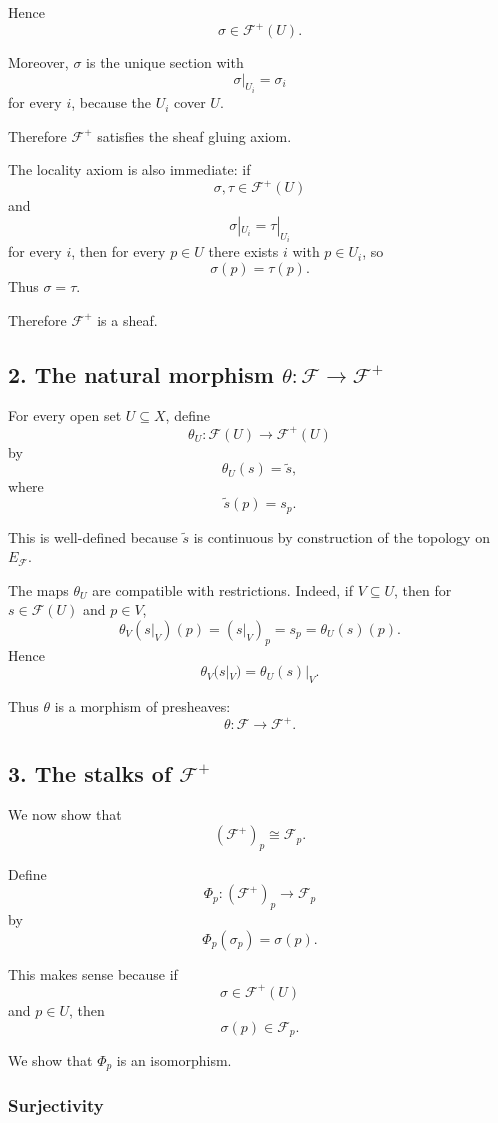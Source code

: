 Hence
\[
\sigma \in \mathcal F^+(U).
\]

Moreover, $\sigma$ is the unique section with
\[
\sigma|_{U_i} = \sigma_i
\]
for every $i$, because the $U_i$ cover $U$.

Therefore $\mathcal F^+$ satisfies the sheaf gluing axiom.

The locality axiom is also immediate: if
\[
\sigma,\tau \in \mathcal F^+(U)
\]
and
\[
\sigma|_{U_i} = \tau|_{U_i}
\]
for every $i$, then for every $p \in U$ there exists $i$ with $p \in U_i$,
so
\[
\sigma(p) = \tau(p).
\]
Thus $\sigma=\tau$.

Therefore $\mathcal F^+$ is a sheaf.

\subsection*{2. The natural morphism $\theta : \mathcal F \to \mathcal F^+$}

For every open set $U \subseteq X$, define
\[
\theta_U : \mathcal F(U) \longrightarrow \mathcal F^+(U)
\]
by
\[
\theta_U(s) = \widetilde{s},
\]
where
\[
\widetilde{s}(p) = s_p.
\]

This is well-defined because $\widetilde{s}$ is continuous by construction of
the topology on $E_{\mathcal F}$.

The maps $\theta_U$ are compatible with restrictions. Indeed, if
$V \subseteq U$, then for $s \in \mathcal F(U)$ and $p \in V$,
\[
\theta_V(s|_V)(p)
=
(s|_V)_p
=
s_p
=
\theta_U(s)(p).
\]
Hence
\[
\theta_V(s|_V)
=
\theta_U(s)|_V.
\]

Thus $\theta$ is a morphism of presheaves:
\[
\theta : \mathcal F \longrightarrow \mathcal F^+.
\]

\subsection*{3. The stalks of $\mathcal F^+$}

We now show that
\[
(\mathcal F^+)_p \cong \mathcal F_p.
\]

Define
\[
\Phi_p : (\mathcal F^+)_p \longrightarrow \mathcal F_p
\]
by
\[
\Phi_p(\sigma_p) = \sigma(p).
\]

This makes sense because if
\[
\sigma \in \mathcal F^+(U)
\]
and $p \in U$, then
\[
\sigma(p) \in \mathcal F_p.
\]

We show that $\Phi_p$ is an isomorphism.

\subsubsection*{Surjectivity}

